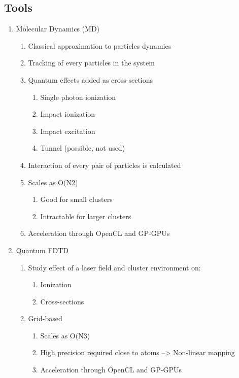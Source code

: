 \subsection{Tools}
\begin{enumerate}
    \item Molecular Dynamics (MD)
        \begin{enumerate}
        \item Classical approximation to particles dynamics
        \item Tracking of every particles in the system
        \item Quantum effects added as cross-sections
            \begin{enumerate}
            \item Single photon ionization
            \item Impact ionization
            \item Impact excitation
            \item Tunnel (possible, not used)
            \end{enumerate}
        \item Interaction of every pair of particles is calculated
            \item Scales as O(N2)
                \begin{enumerate}
                \item Good for small clusters
                \item Intractable for larger clusters
                \end{enumerate}
            \item Acceleration through OpenCL and GP-GPUs
        \end{enumerate}
    \item Quantum FDTD
        \begin{enumerate}
        \item Study effect of a laser field and cluster environment on:
            \begin{enumerate}
            \item Ionization
            \item Cross-sections
            \end{enumerate}
        \item Grid-based
            \begin{enumerate}
            \item Scales as O(N3)
            \item High precision required close to atoms –> Non-linear mapping
            \item Acceleration through OpenCL and GP-GPUs
            \end{enumerate}
        \end{enumerate}
\end{enumerate}




